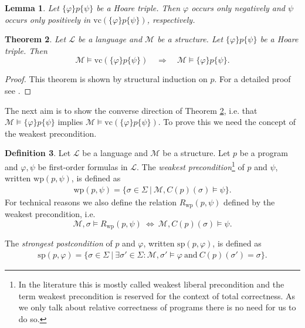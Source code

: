 \documentclass[acmsmall]{acmart}
\theoremstyle{plain}
\newtheorem{theorem}{Theorem}
\newtheorem{lemma}[theorem]{Lemma}
\theoremstyle{definition}
\newtheorem{definition}[theorem]{Definition}
\newcommand{\calL}{\mathcal{L}}
\newcommand{\calM}{\mathcal{M}}
\newcommand{\hoare}[3]{\{#1\}#2\{#3\}}
\newcommand{\vc}{\mathrm{vc}}
\renewcommand{\wp}{\mathrm{wp}}
\newcommand{\Rwp}{R_{\wp}}
\renewcommand{\sp}{\mathrm{sp}}
\begin{document}
\begin{lemma}%
	Let $\hoare{\varphi}{p}{\psi}$ be a Hoare triple. Then $\varphi$ occurs only negatively and $\psi$ occurs only positively in $\vc(\hoare{\varphi}{p}{\psi})$, respectively.
\end{lemma}


\begin{theorem}\label{thm.vcSoundness}
	Let $\calL$ be a language and $\calM$ be a structure. Let $\hoare{\varphi}{p}{\psi}$ be a Hoare triple. Then 
	\[
	\calM \models \vc(\hoare{\varphi}{p}{\psi}) \quad \Rightarrow \quad  \calM \models \hoare{\varphi}{p}{\psi}.
	\]
\end{theorem}
\begin{proof}
This theorem is shown by structural induction on $p$. For a detailed proof see \cite{Kloibhofer20Fixed}.
\end{proof}

The next aim is to show the converse direction of Theorem \ref{thm.vcSoundness}, i.e. that $\calM \models \hoare{\varphi}{p}{\psi}$ implies  $\calM \models \vc(\hoare{\varphi}{p}{\psi})$. To prove this we need the concept of the weakest precondition.

\begin{definition}\label{def.weakPre}
	Let $\calL$ be a language and $\calM$ be a structure. Let $p$ be a program and $\varphi, \psi$ be first-order formulas in $\calL$. The \emph{weakest precondition}\footnote{In the literature this is mostly called weakest liberal precondition and the term weakest precondition is reserved for the context of total correctness. As we only talk about relative correctness of programs there is no need for us to do so.} of $p$ and $\psi$, written $\wp(p,\psi)$, is defined as
	\begin{align*}
		\wp(p,\psi) = \{\sigma \in \Sigma ~|~ \calM,C(p)(\sigma) \models \psi \}.
	\end{align*}
	For technical reasons we also define the relation $\Rwp(p,\psi)$ defined by the weakest precondition, i.e.
	\[
	\calM,\sigma \models \Rwp(p,\psi) ~\Leftrightarrow~ \calM,C(p)(\sigma) \models \psi.
	\]
	

	The \emph{strongest postcondition} of $p$ and $\varphi$, written $\sp(p,\varphi)$, is defined as
	\begin{align*}
		\sp(p,\varphi) = \{\sigma \in \Sigma ~|~ \exists \sigma' \in \Sigma: \calM,\sigma' \models \varphi ~\text{and}~ C(p)(\sigma') = \sigma \}.
	\end{align*}
\end{definition}
\end{document}
